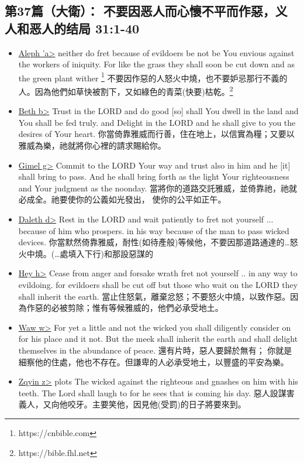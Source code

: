 \subsection{第37篇（大衛）： 不要因恶人而心懷不平而作惡，义人和恶人的结局 31:1-40}
\begin{itemize}
\itemsep-.45em  
\item \underline{Aleph \<'a>} neither do fret because of evildoers be not be You envious against the workers of iniquity. For like the grass they shall soon be cut down and as the green plant wither \footnote{https://cnbible.com}  不要因作惡的人怒火中燒，也不要妒忌那行不義的人。因為他們如草快被割下，又如綠色的青菜(快要)枯乾。\footnote{https://bible.fhl.net}
\item \underline{Beth \<b>} Trust in the LORD and do good [so] shall You dwell in the land and You shall be fed truly. and Delight in the LORD and he shall give to you the desires of Your heart. 你當倚靠雅威而行善，住在地上，以信實為糧；又要以雅威為樂，祂就將你心裡的請求賜給你。
\item \underline{Gimel \<g>} Commit to the LORD Your way and trust also in him and he [it] shall bring to pass. And he shall bring forth as the light Your righteousness and Your judgment as the noonday. 當將你的道路交託雅威，並倚靠祂，祂就必成全。祂要使你的公義如光發出， 使你的公平如正午。
\item \underline{Daleth \<d>} Rest in the LORD and wait patiently to fret not yourself ... because of him who prospers. in his way because of the man to pass wicked devices. 你當默然倚靠雅威，耐性(如待產般)等候他，不要因那道路通達的…怒火中燒。(…處填入下行)和那設惡謀的
\item \underline{Hey \<h>} Cease from anger and forsake wrath fret not yourself .. in any way to evildoing. for evildoers shall be cut off but those who wait on the LORD they shall inherit the earth. 當止住怒氣，離棄忿怒；不要怒火中燒，以致作惡。因為作惡的必被剪除；惟有等候雅威的，他們必承受地土。
\item \underline{Waw \<w>} For yet a little and not the wicked you shall diligently consider on for his place and it not. But the meek shall inherit the earth and shall delight themselves in the abundance of peace. 還有片時，惡人要歸於無有； 你就是細察他的住處，他也不存在。但謙卑的人必承受地土，以豐盛的平安為樂。
\item \underline{Zqyin  \<z>} plots The wicked against the righteous and gnashes on him with his teeth. The Lord shall laugh to for he sees that is coming his day. 惡人設謀害義人，又向他咬牙。主要笑他，因見他(受罰)的日子將要來到。

\end{itemize}
